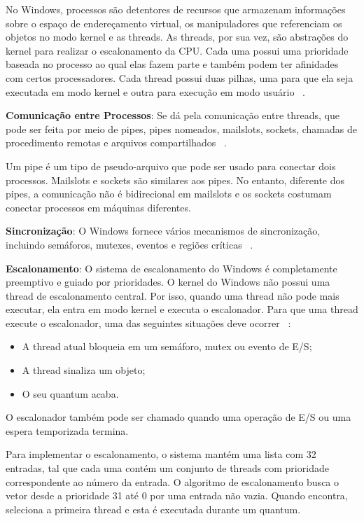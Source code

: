 No Windows, processos são detentores de recursos que armazenam informações sobre o espaço de endereçamento virtual, os manipuladores que referenciam os objetos no modo kernel e as threads. As threads, por sua vez, são abstrações do kernel para realizar o escalonamento da CPU. Cada uma possui uma prioridade baseada no processo ao qual elas fazem parte e também podem ter afinidades com certos processadores. Cada thread possui duas pilhas, uma para que ela seja executada em modo kernel e outra para execução em modo usuário  ~\cite{tanenbaum}.

\textbf{Comunicação entre Processos}: Se dá pela comunicação entre threads, que pode ser feita por meio de pipes, pipes nomeados, mailslots, sockets, chamadas de procedimento remotas e arquivos compartilhados ~\cite{tanenbaum}.

Um pipe é um tipo de pseudo-arquivo que pode ser usado para conectar dois processos. Mailslots e sockets são similares aos pipes. No entanto, diferente dos pipes, a comunicação não é bidirecional em mailslots e os sockets costumam conectar processos em máquinas diferentes. 

\textbf{Sincronização}: O Windows fornece vários mecanismos de sincronização, incluindo semáforos, mutexes, eventos e regiões críticas  ~\cite{tanenbaum}.

\textbf{Escalonamento}: O sistema de escalonamento do Windows é completamente preemptivo e guiado por prioridades.
O kernel do Windows não possui uma thread de escalonamento central. Por isso, quando uma thread não pode mais executar, ela entra em modo kernel e executa o escalonador. Para que uma thread execute o escalonador, uma das seguintes situações deve ocorrer ~\cite{tanenbaum}:
\begin{itemize}
	\item A thread atual bloqueia em um semáforo, mutex ou evento de E/S;
	\item A thread sinaliza um objeto;
	\item O seu quantum acaba.
\end{itemize}

O escalonador também pode ser chamado quando uma operação de E/S ou uma espera temporizada termina.

Para implementar o escalonamento, o sistema mantém uma lista com 32 entradas, tal que cada uma contém um conjunto de threads com prioridade correspondente ao número da entrada. O algoritmo de escalonamento busca o vetor desde a prioridade 31 até 0 por uma entrada não vazia. Quando encontra, seleciona a primeira thread e esta é executada durante um quantum. 

